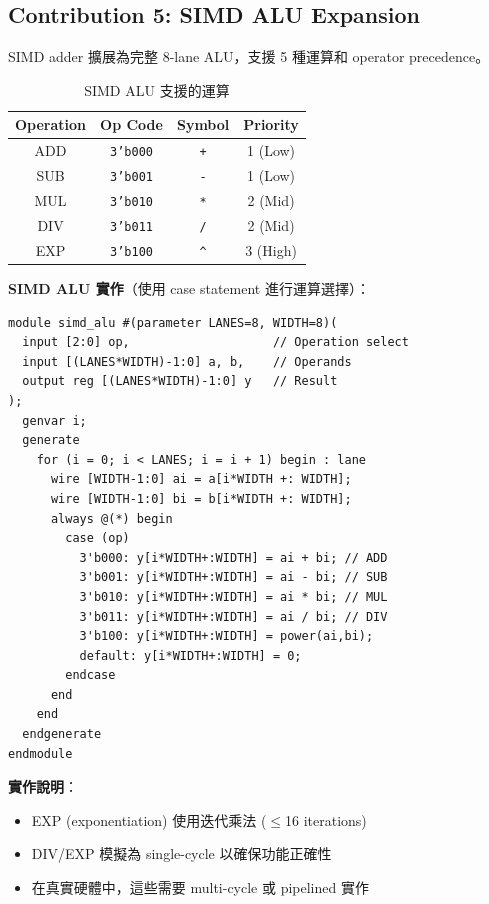 \documentclass[journal]{IEEEtran}
\newcommand{\tagit}[1]{\textit{#1}}
\newcommand{\Goal}{\tagit{目標：}}
\begin{document}
\subsection{Contribution 5: SIMD ALU Expansion}

 SIMD adder 擴展為完整 8-lane ALU，支援 5 種運算和 operator precedence。

\begin{table}[!t]
\centering
\caption{SIMD ALU 支援的運算}
\label{tab:simdops}
\footnotesize
\begin{tabular}{@{}cccc@{}}
\toprule
\textbf{Operation} & \textbf{Op Code} & \textbf{Symbol} & \textbf{Priority} \\
\midrule
ADD & \texttt{3'b000} & \texttt{+} & 1 (Low) \\
SUB & \texttt{3'b001} & \texttt{-} & 1 (Low) \\
MUL & \texttt{3'b010} & \texttt{*} & 2 (Mid) \\
DIV & \texttt{3'b011} & \texttt{/} & 2 (Mid) \\
EXP & \texttt{3'b100} & \texttt{\textasciicircum} & 3 (High) \\
\bottomrule
\end{tabular}
\end{table}

\textbf{SIMD ALU 實作}（使用 case statement 進行運算選擇）：
\begin{lstlisting}
module simd_alu #(parameter LANES=8, WIDTH=8)(
  input [2:0] op,                    // Operation select
  input [(LANES*WIDTH)-1:0] a, b,    // Operands
  output reg [(LANES*WIDTH)-1:0] y   // Result
);
  genvar i;
  generate
    for (i = 0; i < LANES; i = i + 1) begin : lane
      wire [WIDTH-1:0] ai = a[i*WIDTH +: WIDTH];
      wire [WIDTH-1:0] bi = b[i*WIDTH +: WIDTH];
      always @(*) begin
        case (op)
          3'b000: y[i*WIDTH+:WIDTH] = ai + bi; // ADD
          3'b001: y[i*WIDTH+:WIDTH] = ai - bi; // SUB
          3'b010: y[i*WIDTH+:WIDTH] = ai * bi; // MUL
          3'b011: y[i*WIDTH+:WIDTH] = ai / bi; // DIV
          3'b100: y[i*WIDTH+:WIDTH] = power(ai,bi);
          default: y[i*WIDTH+:WIDTH] = 0;
        endcase
      end
    end
  endgenerate
endmodule
\end{lstlisting}

\textbf{實作說明}：
\begin{itemize}
    \item EXP (exponentiation) 使用迭代乘法 ($\leq$16 iterations)
    \item DIV/EXP 模擬為 single-cycle 以確保功能正確性
    \item 在真實硬體中，這些需要 multi-cycle 或 pipelined 實作
\end{itemize}
\end{document}
